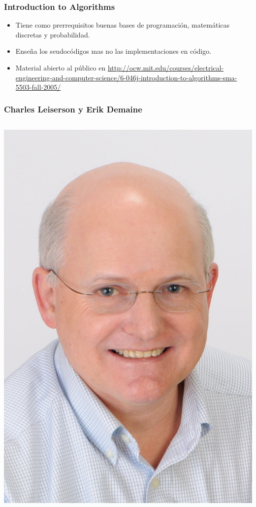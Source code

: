 \documentclass{beamer}
\begin{document}
	\begin{frame}
		\frametitle{Introduction to Algorithms}
		\begin{itemize}
			\item Tiene como prerrequisitos buenas bases de programación, matemáticas discretas y probabilidad.
			\item Enseña los seudocódigos mas no las implementaciones en código.
			\item Material abierto al público en \url{http://ocw.mit.edu/courses/electrical-engineering-and-computer-science/6-046j-introduction-to-algorithms-sma-5503-fall-2005/}
		\end{itemize}
	\end{frame}
	
	\begin{frame}
		\frametitle{Charles Leiserson y Erik Demaine}
		\begin{columns}[l]
				\begin{center} \includegraphics[height = 0.25\textheight]{Leiserson.jpg} \end{center}

\end{columns}
\end{frame}
\end{document}
